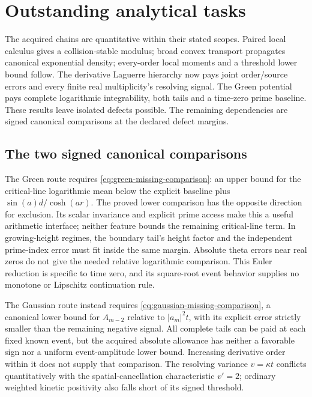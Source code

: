 \section{Outstanding analytical tasks}\label{sec:outstanding}

The acquired chains are quantitative within their stated scopes. Paired
local calculus gives a collision-stable modulus; broad convex transport
propagates canonical exponential density; every-order local moments and
a threshold lower bound follow. The derivative Laguerre hierarchy now
pays joint order/source errors and every finite real multiplicity's
resolving signal. The Green potential pays complete logarithmic
integrability, both tails and a time-zero prime baseline. These results
leave isolated defects possible. The remaining dependencies are signed
canonical comparisons at the declared defect margins.

\subsection{The two signed canonical comparisons}
The Green route requires \eqref{eq:green-missing-comparison}: an upper
bound for the critical-line logarithmic mean below the explicit baseline
plus \(\sin(a)d/\cosh(ar)\). The proved lower comparison has the opposite
direction for exclusion. Its scalar invariance and explicit prime access
make this a useful arithmetic interface; neither feature bounds the
remaining critical-line term. In growing-height regimes, the boundary
tail's height factor and the independent prime-index error must fit
inside the same margin. Absolute theta errors near real zeros do not
give the needed relative logarithmic comparison. This Euler reduction
is specific to time zero, and its square-root event behavior supplies
no monotone or Lipschitz continuation rule.

The Gaussian route instead requires
\eqref{eq:gaussian-missing-comparison}, a canonical lower bound for
\(A_{m-2}\) relative to \(|a_m|^2t\), with its explicit error strictly
smaller than the remaining negative signal. All complete tails can be
paid at each fixed known event, but the acquired absolute allowance
has neither a favorable sign nor a uniform event-amplitude lower bound.
Increasing derivative order within it does not supply that comparison.
The resolving variance \(v=\kappa t\) conflicts quantitatively with the
spatial-cancellation characteristic \(v'=2\); ordinary weighted kinetic
positivity also falls short of its signed threshold.

